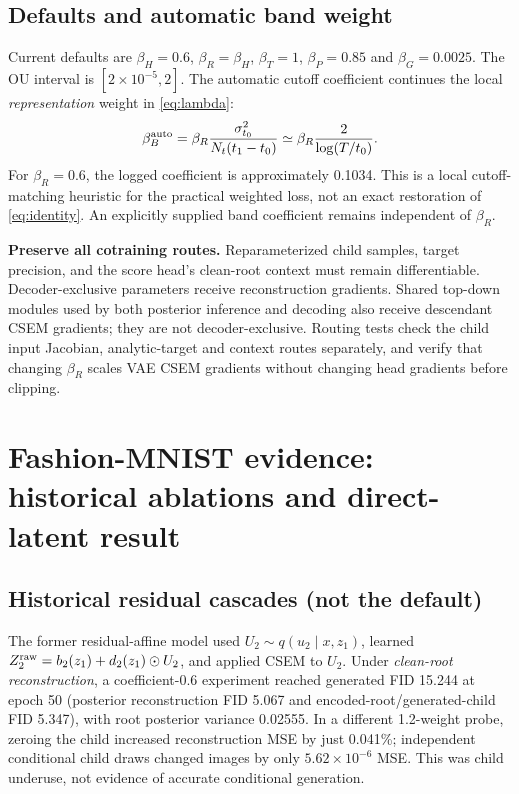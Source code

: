 \documentclass[10pt]{article}
\begin{document}
\subsection{Defaults and automatic band weight}
Current defaults are $\beta_H=0.6$, $\beta_R=\beta_H$, $\beta_T=1$, $\beta_P=0.85$ and $\beta_G=0.0025$. The OU interval is $[2\times10^{-5},2]$. The automatic cutoff coefficient continues the local \emph{representation} weight in \eqref{eq:lambda}:
\begin{equation}
\beta_B^{\rm auto}=\beta_R\frac{\sigma_{t_0}^2}{N_t(t_1-t_0)}\simeq\beta_R\frac{2}{\log(T/t_0)}.
\end{equation}
For $\beta_R=0.6$, the logged coefficient is approximately 0.1034. This is a local cutoff-matching heuristic for the practical weighted loss, not an exact restoration of \eqref{eq:identity}. An explicitly supplied band coefficient remains independent of $\beta_R$.

\textbf{Preserve all cotraining routes.} Reparameterized child samples, target precision, and the score head's clean-root context must remain differentiable. Decoder-exclusive parameters receive reconstruction gradients. Shared top-down modules used by both posterior inference and decoding also receive descendant CSEM gradients; they are not decoder-exclusive. Routing tests check the child input Jacobian, analytic-target and context routes separately, and verify that changing $\beta_R$ scales VAE CSEM gradients without changing head gradients before clipping.

\newpage
\section{Fashion-MNIST evidence: historical ablations and direct-latent result}
\label{sec:historyresult}
\subsection{Historical residual cascades (not the default)}\label{sec:historical}
The former residual-affine model used $U_2\sim q(u_2\mid x,z_1)$, learned $Z_2^{\rm raw}=b_2(z_1)+d_2(z_1)\odot U_2$, and applied CSEM to $U_2$. Under \emph{clean-root reconstruction}, a coefficient-0.6 experiment reached generated FID 15.244 at epoch 50 (posterior reconstruction FID 5.067 and encoded-root/generated-child FID 5.347), with root posterior variance 0.02555. In a different 1.2-weight probe, zeroing the child increased reconstruction MSE by just 0.041\%; independent conditional child draws changed images by only $5.62\times10^{-6}$ MSE. This was child underuse, not evidence of accurate conditional generation.
\end{document}
